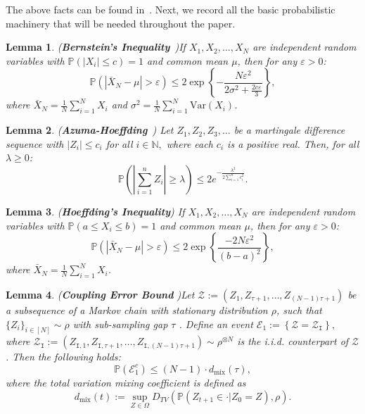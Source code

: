 \documentclass{article}
\newcommand{\mc}{\mathcal}
\newtheorem{lemma}{Lemma}
\begin{document}
The above facts can be found in~\citet{suttonRL}. Next, we record all the basic probabilistic machinery that will be needed throughout the paper. 


\begin{lemma}(\textbf{Bernstein's Inequality}~\cite{chung2006concentration})\label{lemma:bernstein}
If $X_1, X_2, \ldots, X_N$ are independent random variables with $\mathbb{P}(|X_i| \leq c) = 1$ and common mean $\mu$, then for any $\varepsilon > 0$:
\begin{equation}
\mathbb{P}(|\bar{X}_N - \mu| > \varepsilon) \leq 2 \exp\left\{ -\frac{N\varepsilon^2}{2\sigma^2 + \frac{2c\varepsilon}{3}} \right\},
\end{equation}
where $\bar{X}_N = \frac{1}{N} \sum_{i=1}^{N} X_i$ and $\sigma^2 = \frac{1}{N}\sum_{i=1}^{N} \text{Var}(X_i)$.
\end{lemma}

\begin{lemma} (\textbf{Azuma-Hoeffding}~\cite{chung2006concentration})
\label{lemma:AHinequality}
Let $Z_1, Z_2, Z_3, \ldots$ be a martingale difference sequence with $|Z_i| \le c_i$ for all $i \in \mathbb{N},$ where each $c_i$ is a positive real. Then, for all $\lambda \ge 0$:
\[
\mathbb{P}\left(\left|\sum_{i=1}^{n} Z_i\right| \ge \lambda\right) \le 2e^{-\frac{\lambda^2}{2\sum_{i=1}^{n}{c}_i^2}}.
\]
\end{lemma}
\iffalse

\begin{lemma}
 (\textbf{Hoeffding's Inequality}) 
\label{lemma:hoeffding}
If $X_1, X_2, \ldots, X_N$ are independent random variables with $\mathbb{P}(a \leq X_i \leq b) = 1$ and common mean $\mu$, then for any $\varepsilon > 0$:
\begin{equation}
\mathbb{P}(|\bar{X}_N - \mu| > \varepsilon) \leq 2 \exp\left\{\frac{-2N\varepsilon^2}{(b-a)^2}\right\},
\end{equation}
where $\bar{X}_N = \frac{1}{N} \sum_{i=1}^{N} X_i$.
\end{lemma}


\begin{lemma}(\textbf{Coupling Error Bound} \cite{nagaraj})\label{lemm:coupling}
Let $\mc{Z} := (Z_1, Z_{\tau+1}, \ldots, Z_{(N-1)\tau+1})$ be a subsequence of a Markov chain with stationary distribution $\rho$, such that \(\{Z_i\}_{i \in [N]} \sim \rho\) with sub-sampling gap \(\tau\) . Define an event \(\mc{E}_1 := \left\{ \mc{Z} = \mc{Z}_{\texttt{I}} \right\},\)
where $\mc{Z}_{\texttt{I}} := (Z_{\texttt{I},1}, Z_{\texttt{I},\tau+1}, \ldots, Z_{\texttt{I},(N-1)\tau+1}) \sim \rho^{\otimes N}$ is the i.i.d. counterpart of \(\mc{Z}\). Then the following holds:
\begin{equation}
\mathbb{P}(\mc{E}_1^c) \leq (N-1) \cdot d_{\text{mix}}(\tau),
\end{equation}
where the total variation mixing coefficient is defined as
\begin{equation}
d_{\text{mix}}(t) := \sup_{Z \in \Omega} D_{TV} \left( \mathbb{P}(Z_{t+1} \in \cdot \lvert Z_0 = Z), \rho \right).
\end{equation}
\end{lemma}
\end{document}
